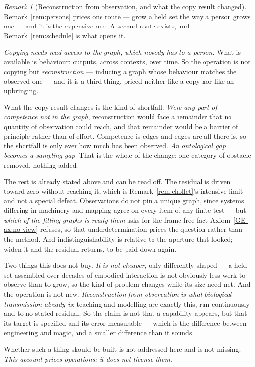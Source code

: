 \documentclass[11pt,a4paper]{article}
\theoremstyle{remark}
\newtheorem{remark}[definition]{Remark}
\begin{document}
\begin{remark}[Reconstruction from observation, and what the copy result changed]\label{rem:reconstruct}
Remark~\ref{rem:persons} prices one route --- grow a held set the way a person grows one --- and it is
the expensive one. A second route exists, and Remark~\ref{rem:schedule} is what opens it.

\emph{Copying needs read access to the graph, which nobody has to a person.} What is available is
behaviour: outputs, across contexts, over time. So the operation is not copying but
\emph{reconstruction} --- inducing a graph whose behaviour matches the observed one --- and it is a
third thing, priced neither like a copy nor like an upbringing.

What the copy result changes is the kind of shortfall. \emph{Were any part of competence not in the
graph}, reconstruction would face a remainder that no quantity of observation could reach, and that
remainder would be a barrier of principle rather than of effort. Competence is edges and edges are all
there is, so the shortfall is only ever how much has been observed. \emph{An ontological gap becomes a
sampling gap.} That is the whole of the change: one category of obstacle removed, nothing added.

The rest is already stated above and can be read off. The residual is driven toward zero without
reaching it, which is Remark~\ref{rem:chollet}'s intensive limit and not a special defeat. Observations
do not pin a unique graph, since systems differing in machinery and mapping agree on every item of any
finite test --- but \emph{which of the fitting graphs is really them} asks for the frame-free fact
Axiom~\ref{GE-ax:no-view} refuses, so that underdetermination prices the question rather than the method. And
indistinguishability is relative to the aperture that looked; widen it and the residual returns, to be
paid down again.

Two things this does not buy. \emph{It is not cheaper}, only differently shaped --- a held set
assembled over decades of embodied interaction is not obviously less work to observe than to grow, so
the kind of problem changes while its size need not. And the operation is not new. \emph{Reconstruction
from observation is what biological transmission already is}: teaching and modelling are exactly this,
run continuously and to no stated residual. So the claim is not that a capability appears, but that its
target is specified and its error measurable --- which is the difference between engineering and magic,
and a smaller difference than it sounds.

Whether such a thing should be built is not addressed here and is not missing. \emph{This account
prices operations; it does not license them.}
\end{remark}
\end{document}
